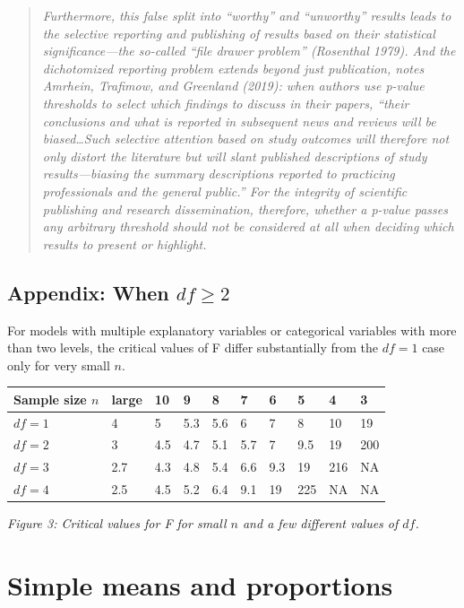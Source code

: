 \documentclass[]{book}
\begin{document}
\begin{quote}
\emph{Furthermore, this false split into ``worthy'' and ``unworthy'' results leads to the selective reporting and publishing of results based on their statistical significance---the so-called ``file drawer problem'' (Rosenthal 1979). And the dichotomized reporting problem extends beyond just publication, notes Amrhein, Trafimow, and Greenland (2019): when authors use p-value thresholds to select which findings to discuss in their papers, ``their conclusions and what is reported in subsequent news and reviews will be biased\ldots{}Such selective attention based on study outcomes will therefore not only distort the literature but will slant published descriptions of study results---biasing the summary descriptions reported to practicing professionals and the general public.'' For the integrity of scientific publishing and research dissemination, therefore, whether a p-value passes any arbitrary threshold should not be considered at all when deciding which results to present or highlight.}
\end{quote}

\hypertarget{appendix-when-df-geq-2}{%
\section{\texorpdfstring{Appendix: When \(df \geq 2\)}{Appendix: When df \textbackslash{}geq 2}}\label{appendix-when-df-geq-2}}

For models with multiple explanatory variables or categorical variables with more than two levels, the critical values of F differ substantially from the \(df = 1\) case only for very small \(n\).

\begin{longtable}[]{@{}llllllllll@{}}
\toprule
Sample size \(n\) & large & 10 & 9 & 8 & 7 & 6 & 5 & 4 & 3\tabularnewline
\midrule
\endhead
\(df = 1\) & 4 & 5 & 5.3 & 5.6 & 6 & 7 & 8 & 10 & 19\tabularnewline
\(df = 2\) & 3 & 4.5 & 4.7 & 5.1 & 5.7 & 7 & 9.5 & 19 & 200\tabularnewline
\(df = 3\) & 2.7 & 4.3 & 4.8 & 5.4 & 6.6 & 9.3 & 19 & 216 & NA\tabularnewline
\(df = 4\) & 2.5 & 4.5 & 5.2 & 6.4 & 9.1 & 19 & 225 & NA & NA\tabularnewline
\bottomrule
\end{longtable}

\emph{Figure 3: Critical values for F for small \(n\) and a few different values of \(df\).}

\hypertarget{simple-means-and-proportions}{%
\chapter{Simple means and proportions}\label{simple-means-and-proportions}}
\end{document}
